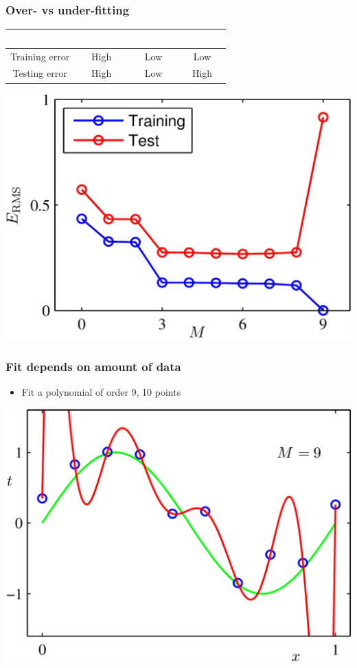 \documentclass[12pt,notes,mathserif]{beamer}
\begin{document}
\begin{frame}[c]
\frametitle{Over- vs under-fitting}

\begin{center}
\begin{tabular}{|c|c|c|c|}
\rowcolor{.!30!gray}
&\textcolor{white}{Under-fit}&\textcolor{white}{Good fit}&\textcolor{white}{Over-fit}\\\hline
Training error& High& Low& Low\\\hline
Testing error& High &Low &High\\\hline
\end{tabular}%
\end{center}
\begin{center}
\includegraphics[width=0.61\linewidth]{fig/lec59.jpg}
\end{center}
\end{frame}

\begin{frame}[c]
\frametitle{Fit depends on amount of data}
\begin{itemize}
\item  Fit a polynomial of order 9, 10 points
\end{itemize}
\begin{center}
\includegraphics[width=0.61\linewidth]{fig/lec510.jpg}
\end{center}
\end{frame}
\end{document}

